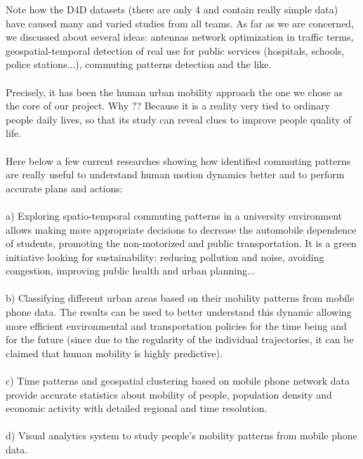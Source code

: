 Note how the D4D datasets (there are only 4 and contain really simple data) have caused many and varied studies from all teams. As far as we are concerned, we discussed about several ideas: antennas network optimization in traffic terms, geospatial-temporal detection of real use for public services (hospitals, schools, police stations...), commuting patterns detection and the like.
\\
\\
Precisely, it has been the human urban mobility approach the one we chose as the core of our project. Why ?? Because it is a reality very tied to ordinary people daily lives, so that its study can reveal clues to improve people quality of life.
\\
\\
Here below a few current researches showing how identified commuting patterns are really useful to understand human motion dynamics better and to perform accurate plans and actions:
\\
\\
a) Exploring spatio-temporal commuting patterns in a university environment allows making more appropriate decisions to decrease the automobile dependence of students, promoting the non-motorized and public transportation. It is a green initiative looking for sustainability: reducing pollution and noise, avoiding congestion, improving public health and urban planning...
\\
\\
b) Classifying different urban areas based on their mobility patterns from mobile phone data. The results can be used to better understand this dynamic allowing more efficient environmental and transportation policies for the time being and for the future (since due to the regularity of the individual trajectories, it can be claimed that human mobility is highly predictive).
\\
\\
c) Time patterns and geospatial clustering based on mobile phone network data provide accurate statistics about mobility of people, population density and economic activity with detailed regional and time resolution.
\\
\\
d) Visual analytics system to study people's mobility patterns from mobile phone data.
\\
\\